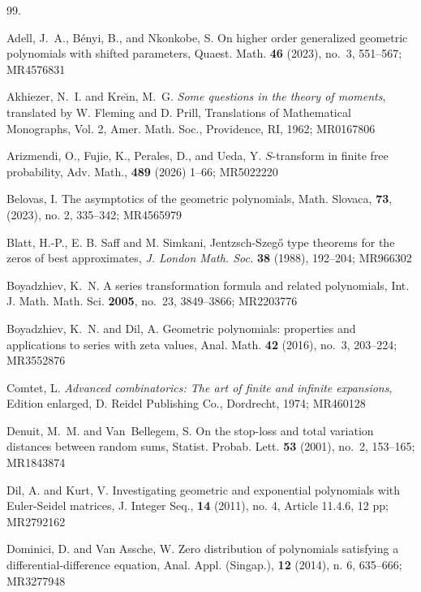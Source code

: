 \documentclass[11pt]{article}
\begin{document}
\begin{thebibliography}{99.}

 Adell, J.~A.,  B\'enyi, B.,  and  Nkonkobe, S. On higher order generalized geometric polynomials with shifted parameters, Quaest. Math. {\bf 46} (2023), no.~3, 551--567; MR4576831

 Akhiezer, N.~I. and Kre\u{\i}n, M.~G. {\it Some questions in the theory of moments}, translated by W. Fleming and D. Prill, 
Translations of Mathematical Monographs, Vol. 2, Amer. Math. Soc., Providence, RI, 1962; MR0167806

 Arizmendi, O., Fujie, K., Perales, D., and Ueda, Y. {$S$}-transform in finite free probability, Adv. Math., {\bf 489} (2026) 1--66; MR5022220

 Belovas, I. The asymptotics of the geometric polynomials, Math. Slovaca, {\bf 73}, (2023), no. 2, 335--342; MR4565979

 Blatt, H.-P., E. B. Saff and M. Simkani, Jentzsch-Szeg\H{o} type theorems for the zeros of best approximates, \textit{J. London Math. Soc.} \textbf{38} (1988), 192--204; MR966302

 Boyadzhiev, K.~N.  A series transformation formula and related polynomials, Int. J. Math. Math. Sci. {\bf 2005}, no.~23, 3849--3866; MR2203776

 Boyadzhiev, K.~N.  and Dil, A. Geometric polynomials: properties and applications to series with zeta values, Anal. Math. {\bf 42} (2016), no.~3, 203--224; MR3552876

 Comtet, L. {\it Advanced combinatorics: {\small The art of finite and infinite expansions}}, Edition enlarged, D. Reidel Publishing Co., Dordrecht, 1974; MR460128


 Denuit, M.~M.  and Van~Bellegem, S.  On the stop-loss and total variation distances between random sums, Statist. Probab. Lett. {\bf 53} (2001), no.~2, 153--165; MR1843874

 Dil, A. and  Kurt, V. Investigating geometric and exponential polynomials with {E}uler-{S}eidel matrices, J. Integer Seq., {\bf 14} (2011), no. 4, Article 11.4.6, 12 pp; MR2792162

 Dominici, D. and Van Assche, W. Zero distribution of polynomials satisfying a differential-difference equation, Anal. Appl. (Singap.), {\bf 12} (2014), n. 6, 635--666; MR3277948


\end{thebibliography}
\end{document}
